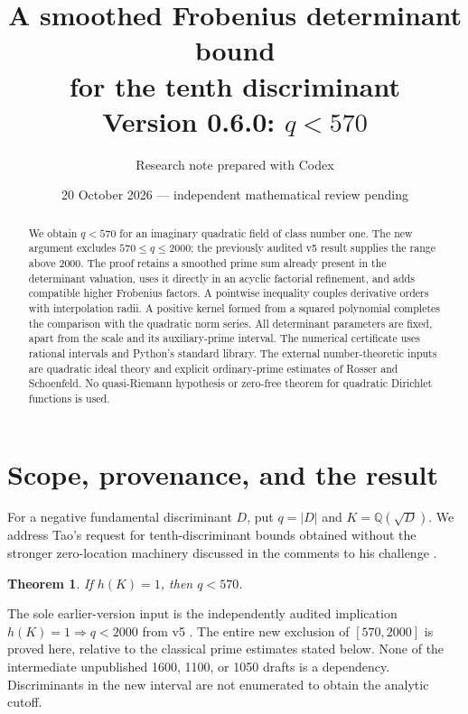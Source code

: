 \documentclass[11pt]{article}
\title{A smoothed Frobenius determinant bound\\for the tenth discriminant\\
\large Version 0.6.0: \(q<570\)}
\author{Research note prepared with Codex}
\date{20 October 2026 --- independent mathematical review pending}
\newtheorem{theorem}{Theorem}
\newcommand{\Q}{\mathbb Q}
\begin{document}
\maketitle

\begin{abstract}
We obtain \(q<570\) for an imaginary quadratic field of class number
one. The new argument excludes \(570\le q\le2000\); the previously
audited v5 result supplies the range above 2000. The proof retains a
smoothed prime sum already present in the determinant valuation,
uses it directly in an acyclic factorial refinement, and adds compatible
higher Frobenius factors. A pointwise inequality couples derivative
orders with interpolation radii. A positive kernel formed from a squared
polynomial completes the comparison with the quadratic norm series.
All determinant parameters are fixed, apart from the scale and its
auxiliary-prime interval. The numerical certificate uses rational
intervals and Python's standard library. The external number-theoretic
inputs are quadratic ideal theory and explicit ordinary-prime estimates
of Rosser and Schoenfeld. No quasi-Riemann hypothesis or zero-free theorem
for quadratic Dirichlet functions is used.
\end{abstract}

\section{Scope, provenance, and the result}
For a negative fundamental discriminant \(D\), put \(q=|D|\) and
\(K=\Q(\sqrt D)\). We address Tao's request for tenth-discriminant
bounds obtained without the stronger zero-location machinery discussed
in the comments to his challenge \cite{tao,taocomment}.

\begin{theorem}\label{main}
If \(h(K)=1\), then \(q<570\).
\end{theorem}

The sole earlier-version input is the independently audited implication
\(h(K)=1\Rightarrow q<2000\) from v5 \cite{v5}. The entire new exclusion
of \([570,2000]\) is proved here, relative to the classical prime estimates
stated below. None of the intermediate unpublished 1600, 1100, or 1050
drafts is a dependency. Discriminants in the new interval are not
enumerated to obtain the analytic cutoff.
\end{document}
